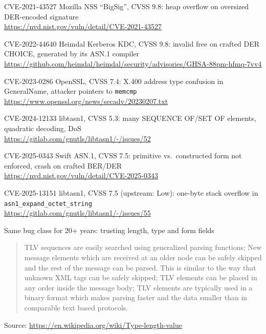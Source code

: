 \documentclass[Screen16to9,17pt]{foils}
\begin{document}
\begin{list2}
\item CVE-2021-43527 Mozilla NSS ``BigSig'', CVSS 9.8: heap overflow on
      oversized DER-encoded signature\\
      \url{https://nvd.nist.gov/vuln/detail/CVE-2021-43527}
\item CVE-2022-44640 Heimdal Kerberos KDC, CVSS 9.8: invalid free on
      crafted DER CHOICE, generated by its ASN.1 compiler
      \url{https://github.com/heimdal/heimdal/security/advisories/GHSA-88pm-hfmq-7vv4}
\item CVE-2023-0286 OpenSSL, CVSS 7.4: X.400 address type confusion
      in GeneralName, attacker pointers to \verb+memcmp+\\
      \url{https://www.openssl.org/news/secadv/20230207.txt}
\item CVE-2024-12133 libtasn1, CVSS 5.3: many SEQUENCE OF/SET OF
      elements, quadratic decoding, DoS\\
      \url{https://gitlab.com/gnutls/libtasn1/-/issues/52}
\item CVE-2025-0343 Swift ASN.1, CVSS 7.5: primitive vs.\ constructed
      form not enforced, crash on crafted BER/DER\\
      \url{https://nvd.nist.gov/vuln/detail/CVE-2025-0343}
\item CVE-2025-13151 libtasn1, CVSS 7.5 (upstream: Low): one-byte
      stack overflow in \verb+asn1_expand_octet_string+\\
      \url{https://gitlab.com/gnutls/libtasn1/-/issues/55}
\end{list2}

\begin{list1}
\item Same bug class for 20+ years: trusting length, type and form fields
\end{list1}



\begin{quote}
  TLV sequences are easily searched using generalized parsing functions;
New message elements which are received at an older node can be safely skipped and the rest of the message can be parsed. This is similar to the way that unknown XML tags can be safely skipped;
TLV elements can be placed in any order inside the message body;
TLV elements are typically used in a binary format which makes parsing faster and the data smaller than in comparable text based protocols.
\end{quote}
Source: \url{https://en.wikipedia.org/wiki/Type-length-value}
\end{document}
